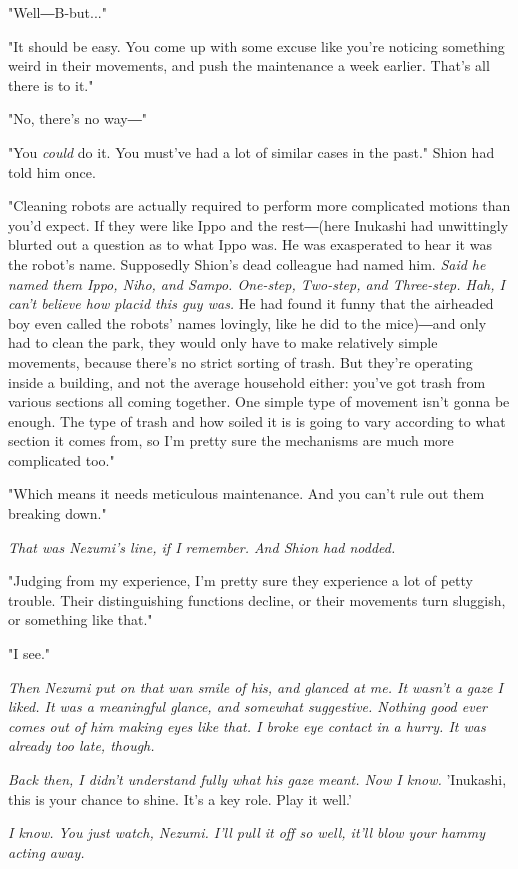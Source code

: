"Well―B-but..."

"It should be easy. You come up with some excuse like you're noticing
something weird in their movements, and push the maintenance a week
earlier. That's all there is to it."

"No, there's no way―"

"You \emph{could} do it. You must've had a lot of similar cases in the past."
Shion had told him once.

"Cleaning robots are actually required to perform more complicated
motions than you'd expect. If they were like Ippo and the rest―(here
Inukashi had unwittingly blurted out a question as to what Ippo was. He
was exasperated to hear it was the robot's name. Supposedly Shion's dead
colleague had named him. \emph{Said he named them Ippo, Niho, and Sampo.
One-step, Two-step, and Three-step. Hah, I can't believe how placid this
guy was.} He had found it funny that the airheaded boy even called the
robots' names lovingly, like he did to the mice)―and only had to clean
the park, they would only have to make relatively simple movements,
because there's no strict sorting of trash. But they're operating inside
a building, and not the average household either: you've got trash from
various sections all coming together. One simple type of movement isn't
gonna be enough. The type of trash and how soiled it is is going to vary
according to what section it comes from, so I'm pretty sure the
mechanisms are much more complicated too."~

"Which means it needs meticulous maintenance. And you can't rule out
them breaking down."

\emph{That was Nezumi's line, if I remember. And Shion had nodded.}

"Judging from my experience, I'm pretty sure they experience a lot of
petty trouble. Their distinguishing functions decline, or their
movements turn sluggish, or something like that."

"I see."

\emph{Then Nezumi put on that wan smile of his, and glanced at me. It wasn't a
gaze I liked. It was a meaningful glance, and somewhat suggestive.
Nothing good ever comes out of him making eyes like that. I broke eye
contact in a hurry. It was already too late, though.}

\emph{Back then, I didn't understand fully what his gaze meant. Now I know.}
'Inukashi, this is your chance to shine. It's a key role. Play it well.'

\emph{I know. You just watch, Nezumi. I'll pull it off so well, it'll blow
your hammy acting away.}

